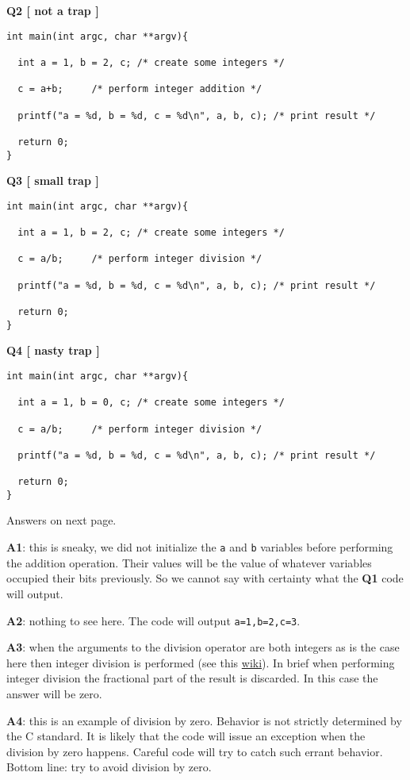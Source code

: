 {\bf Q2 [ not a trap ]}
\begin{verbatim}
int main(int argc, char **argv){

  int a = 1, b = 2, c; /* create some integers */
  
  c = a+b;     /* perform integer addition */

  printf("a = %d, b = %d, c = %d\n", a, b, c); /* print result */
  
  return 0;
}
\end{verbatim}

{\bf Q3 [ small trap ]}
\begin{verbatim}
int main(int argc, char **argv){

  int a = 1, b = 2, c; /* create some integers */
  
  c = a/b;     /* perform integer division */

  printf("a = %d, b = %d, c = %d\n", a, b, c); /* print result */
  
  return 0;
}
\end{verbatim}

{\bf Q4 [ nasty trap ]}
\begin{verbatim}
int main(int argc, char **argv){

  int a = 1, b = 0, c; /* create some integers */
  
  c = a/b;     /* perform integer division */

  printf("a = %d, b = %d, c = %d\n", a, b, c); /* print result */
  
  return 0;
}
\end{verbatim}


Answers on next page.

\newpage
{\bf A1}: this is sneaky, we did not initialize the \texttt{a} and \texttt{b} variables before performing the addition operation. Their values will be the value of whatever variables occupied their bits previously. So we cannot say with certainty what the {\bf Q1} code will output.

{\bf A2}: nothing to see here. The code will output \texttt{a=1,b=2,c=3}.

{\bf A3}: when the arguments to the division operator are both integers as is the case here then integer division is performed (see this \href{https://en.wikipedia.org/wiki/Division_(mathematics)#Of_integers}{wiki}). In brief when performing integer division the fractional part of the result is discarded. In this case the answer will be zero.

{\bf A4}: this is an example of division by zero. Behavior is not strictly determined by the C standard. It is likely that the code will issue an exception when the division by zero happens. Careful code will try to catch such errant behavior. Bottom line: try to avoid division by zero.

